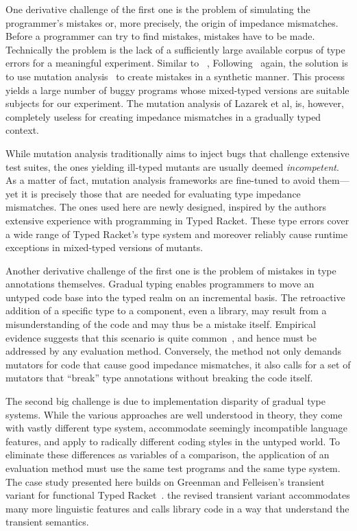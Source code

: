 One derivative challenge of the first one is the problem of simulating the
programmer's mistakes or, more precisely, the origin of impedance
mismatches. Before a programmer can try to find mistakes, mistakes have to be
made. Technically the problem is the lack of a sufficiently large available
corpus of type errors for a meaningful experiment. Similar to
~\citet{lksfd-popl-2020}, Following~\citet{lksfd-popl-2020} again, the solution
is to use mutation analysis~\cite{lipton1971fault, demillo1978hints,
jia2011analysis} to create mistakes in a synthetic manner. This process yields a
large number of buggy programs whose mixed-typed versions are suitable subjects
for our experiment.  The mutation analysis of Lazarek et al, is, however,
completely useless for creating impedance mismatches in a gradually typed
context.

While mutation analysis traditionally aims to inject bugs that challenge
extensive test suites, the ones yielding ill-typed mutants are usually deemed
\emph{incompetent}. As a matter of fact, mutation analysis frameworks are
fine-tuned to avoid them---yet it is precisely those that are needed for
evaluating type impedance mismatches. The ones used here are newly designed,
inspired by the authors extensive experience with programming in Typed Racket.
These type errors cover a wide range of Typed Racket's type system and moreover
reliably cause runtime exceptions in mixed-typed versions of mutants.

Another derivative challenge of the first one is the problem of mistakes in type
annotations themselves.  Gradual typing enables programmers to move an untyped
code base into the typed realm on an incremental basis. The retroactive addition
of a specific type to a component, even a library, may result from a
misunderstanding of the code and may thus be a mistake itself. Empirical
evidence suggests that this scenario is quite common~\cite{sta-nt-base-types,
incorrect-ts, wmwz-ecoop-2017}, and hence must be addressed by any evaluation
method. Conversely, the method not only demands mutators for code that cause
good impedance mismatches, it also calls for a set of mutators that ``break''
type annotations without breaking the code itself. 

The second big challenge is due to implementation disparity of gradual type
systems. While the various approaches are well understood in theory, they come
with vastly different type system, accommodate seemingly incompatible language
features, and apply to radically different coding styles in the untyped world.
To eliminate these differences as variables of a comparison, the application of
an evaluation method must use the same test programs and the same type system.
The case study presented here builds on Greenman and Felleisen's transient
variant for functional Typed Racket~\cite{gf-icfp-2018}. the revised transient
variant accommodates many more linguistic features and calls library code in a
way that understand the transient semantics.

